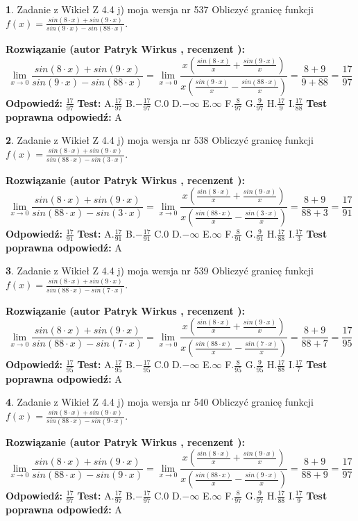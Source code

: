 \documentclass[12pt, a4paper]{article}
\theoremstyle{definition} %
\newtheorem{zad}{}
\newcommand{\zadStart}[1]{\begin{zad}#1\newline}
\newcommand{\zadStop}{\end{zad}}
\newcommand{\rozwStart}[2]{\noindent \textbf{Rozwiązanie (autor #1 , recenzent #2): }\newline}
\newcommand{\rozwStop}{\newline}
\newcommand{\odpStart}{\noindent \textbf{Odpowiedź:}\newline}
\newcommand{\odpStop}{\newline}
\newcommand{\testStart}{\noindent \textbf{Test:}\newline}
\newcommand{\testStop}{\newline}
\newcommand{\kluczStart}{\noindent \textbf{Test poprawna odpowiedź:}\newline}
\newcommand{\kluczStop}{\newline}
\begin{document}
\zadStart{Zadanie z Wikieł Z 4.4 j) moja wersja nr 537}
Obliczyć granicę funkcji $f(x)=\frac{sin(8\cdot x) +sin(9\cdot x)}{sin(9\cdot x) -sin(88\cdot x)}$.
\zadStop
\rozwStart{Patryk Wirkus}{}
$$\lim\limits_{x\to 0}\frac{sin(8\cdot x) +sin(9\cdot x)}{sin(9\cdot x) -sin(88\cdot x)}=\lim\limits_{x\to 0}\frac{x(\frac{sin(8\cdot x)}{x}+\frac{sin(9\cdot x)}{x})}{x(\frac{sin(9\cdot x)}{x}-\frac{sin(88\cdot x)}{x})}=\frac{8+9}{9+88} = \frac{17}{97}$$
\rozwStop
\odpStart
$\frac{17}{97}$
\odpStop
\testStart
A.$\frac{17}{97}$
B.$-\frac{17}{97}$
C.$0$
D.$-\infty$
E.$\infty$
F.$\frac{8}{97}$
G.$\frac{9}{97}$
H.$\frac{17}{9}$
I.$\frac{17}{88}$
\testStop
\kluczStart
A
\kluczStop



\zadStart{Zadanie z Wikieł Z 4.4 j) moja wersja nr 538}
Obliczyć granicę funkcji $f(x)=\frac{sin(8\cdot x) +sin(9\cdot x)}{sin(88\cdot x) -sin(3\cdot x)}$.
\zadStop
\rozwStart{Patryk Wirkus}{}
$$\lim\limits_{x\to 0}\frac{sin(8\cdot x) +sin(9\cdot x)}{sin(88\cdot x) -sin(3\cdot x)}=\lim\limits_{x\to 0}\frac{x(\frac{sin(8\cdot x)}{x}+\frac{sin(9\cdot x)}{x})}{x(\frac{sin(88\cdot x)}{x}-\frac{sin(3\cdot x)}{x})}=\frac{8+9}{88+3} = \frac{17}{91}$$
\rozwStop
\odpStart
$\frac{17}{91}$
\odpStop
\testStart
A.$\frac{17}{91}$
B.$-\frac{17}{91}$
C.$0$
D.$-\infty$
E.$\infty$
F.$\frac{8}{91}$
G.$\frac{9}{91}$
H.$\frac{17}{88}$
I.$\frac{17}{3}$
\testStop
\kluczStart
A
\kluczStop



\zadStart{Zadanie z Wikieł Z 4.4 j) moja wersja nr 539}
Obliczyć granicę funkcji $f(x)=\frac{sin(8\cdot x) +sin(9\cdot x)}{sin(88\cdot x) -sin(7\cdot x)}$.
\zadStop
\rozwStart{Patryk Wirkus}{}
$$\lim\limits_{x\to 0}\frac{sin(8\cdot x) +sin(9\cdot x)}{sin(88\cdot x) -sin(7\cdot x)}=\lim\limits_{x\to 0}\frac{x(\frac{sin(8\cdot x)}{x}+\frac{sin(9\cdot x)}{x})}{x(\frac{sin(88\cdot x)}{x}-\frac{sin(7\cdot x)}{x})}=\frac{8+9}{88+7} = \frac{17}{95}$$
\rozwStop
\odpStart
$\frac{17}{95}$
\odpStop
\testStart
A.$\frac{17}{95}$
B.$-\frac{17}{95}$
C.$0$
D.$-\infty$
E.$\infty$
F.$\frac{8}{95}$
G.$\frac{9}{95}$
H.$\frac{17}{88}$
I.$\frac{17}{7}$
\testStop
\kluczStart
A
\kluczStop



\zadStart{Zadanie z Wikieł Z 4.4 j) moja wersja nr 540}
Obliczyć granicę funkcji $f(x)=\frac{sin(8\cdot x) +sin(9\cdot x)}{sin(88\cdot x) -sin(9\cdot x)}$.
\zadStop
\rozwStart{Patryk Wirkus}{}
$$\lim\limits_{x\to 0}\frac{sin(8\cdot x) +sin(9\cdot x)}{sin(88\cdot x) -sin(9\cdot x)}=\lim\limits_{x\to 0}\frac{x(\frac{sin(8\cdot x)}{x}+\frac{sin(9\cdot x)}{x})}{x(\frac{sin(88\cdot x)}{x}-\frac{sin(9\cdot x)}{x})}=\frac{8+9}{88+9} = \frac{17}{97}$$
\rozwStop
\odpStart
$\frac{17}{97}$
\odpStop
\testStart
A.$\frac{17}{97}$
B.$-\frac{17}{97}$
C.$0$
D.$-\infty$
E.$\infty$
F.$\frac{8}{97}$
G.$\frac{9}{97}$
H.$\frac{17}{88}$
I.$\frac{17}{9}$
\testStop
\kluczStart
A
\kluczStop
\end{document}
